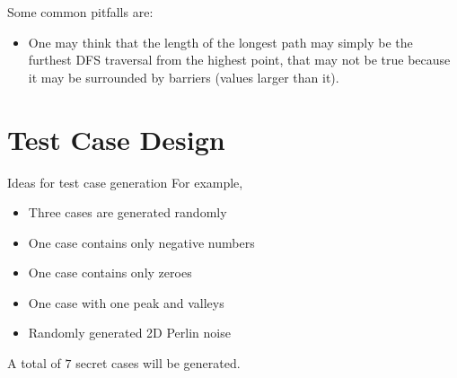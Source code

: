\documentclass[a4paper,11pt]{article}
\begin{document}
Some common pitfalls are: 

\begin{itemize}
    \item One may think that the length of the longest path may simply be the furthest DFS traversal from the highest point, that may not be true because it may be surrounded by barriers (values larger than it). 
\end{itemize}

\section{Test Case Design}

Ideas for test case generation
For example,

\begin{itemize}
    \item Three cases are generated randomly
    \item One case contains only negative numbers
    \item One case contains only zeroes
    \item One case with one peak and valleys
    \item Randomly generated 2D Perlin noise
\end{itemize}

A total of $7$ secret cases will be generated.
\end{document}
